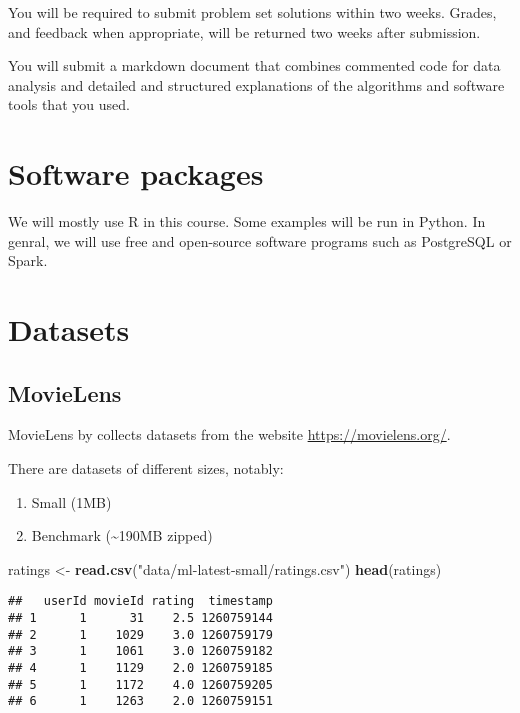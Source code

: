 \documentclass[]{book}
\newenvironment{Shaded}{\begin{snugshade}}{\end{snugshade}}
\newcommand{\KeywordTok}[1]{\textcolor[rgb]{0.13,0.29,0.53}{\textbf{{#1}}}}
\newcommand{\StringTok}[1]{\textcolor[rgb]{0.31,0.60,0.02}{{#1}}}
\newcommand{\NormalTok}[1]{{#1}}
\providecommand{\tightlist}{%
  \setlength{\itemsep}{0pt}\setlength{\parskip}{0pt}}
\theoremstyle{definition}
\theoremstyle{definition}
\theoremstyle{definition}
\theoremstyle{remark}
\begin{document}
You will be required to submit problem set solutions within two weeks.
Grades, and feedback when appropriate, will be returned two weeks after
submission.

You will submit a markdown document that combines commented code for
data analysis and detailed and structured explanations of the algorithms
and software tools that you used.

\section{Software packages}\label{software-packages}

We will mostly use R in this course. Some examples will be run in
Python. In genral, we will use free and open-source software programs
such as PostgreSQL or Spark.

\section{Datasets}\label{datasets}

\subsection{MovieLens}\label{movielens}

MovieLens by
\citet[\url{https://grouplens.org/datasets/movielens/}]{Harper2015}
collects datasets from the website \url{https://movielens.org/}.

There are datasets of different sizes, notably:

\begin{enumerate}
\def\labelenumi{\arabic{enumi}.}
\tightlist
\item
  Small (1MB)
\item
  Benchmark (\textasciitilde{}190MB zipped)
\end{enumerate}

\begin{Shaded}
\begin{Highlighting}[]
\NormalTok{ratings <-}\StringTok{ }\KeywordTok{read.csv}\NormalTok{(}\StringTok{"data/ml-latest-small/ratings.csv"}\NormalTok{)}
\KeywordTok{head}\NormalTok{(ratings)}
\end{Highlighting}
\end{Shaded}

\begin{verbatim}
##   userId movieId rating  timestamp
## 1      1      31    2.5 1260759144
## 2      1    1029    3.0 1260759179
## 3      1    1061    3.0 1260759182
## 4      1    1129    2.0 1260759185
## 5      1    1172    4.0 1260759205
## 6      1    1263    2.0 1260759151
\end{verbatim}
\end{document}
